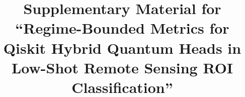 \documentclass[onecolumn,journal]{IEEEtran}
\begin{document}
\title{Supplementary Material for ``Regime-Bounded Metrics for Qiskit Hybrid Quantum Heads in Low-Shot Remote Sensing ROI Classification''}
\author{}
\maketitle


\end{document}
